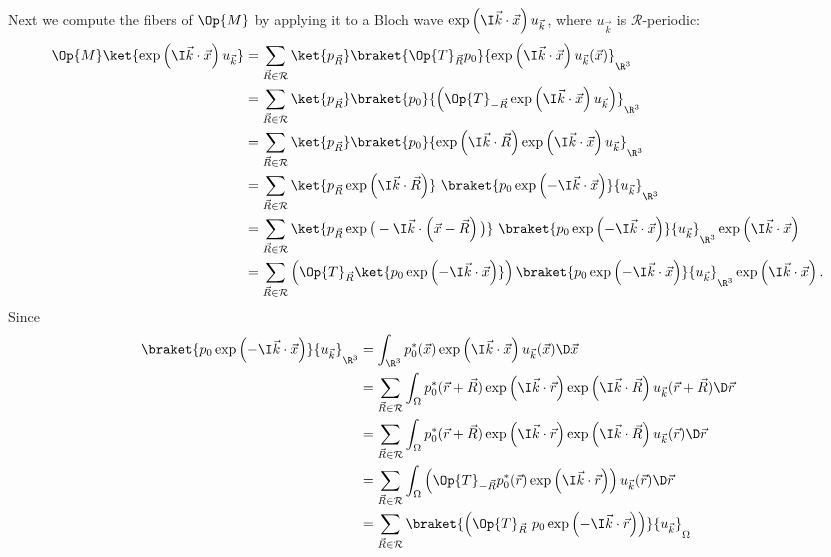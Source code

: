 \documentclass{MFHarticle}
\begin{document}
Next we compute the fibers of $\Op{M}$
by applying it to a
Bloch wave $\exp\left(\I \vec{k} \cdot \vec{x}\right) u_{\vec{k}}$,
where $u_{\vec{k}}$ is $\mathcal{R}$-periodic:
\begin{align*}
\Op{M} \ket{\exp\left(\I \vec{k} \cdot \vec{x}\right) u_{\vec{k}}}
&= \sum_{\vec{R} \in \mathcal{R}}
\ket{p_{\vec{R}}} \braket{\Op{T}_{\vec{R}} p_0}
{\exp\left(\I \vec{k} \cdot \vec{x}\right) u_{\vec{k}}(\vec{x})}_{\R^3} \\
&= \sum_{\vec{R} \in \mathcal{R}}
\ket{p_{\vec{R}}} \braket{p_0}
{\left(\Op{T}_{-\vec{R}}
	\exp\left(\I \vec{k} \cdot \vec{x}\right) u_{\vec{k}}
\right)}_{\R^3} \\
&= \sum_{\vec{R} \in \mathcal{R}}
\ket{p_{\vec{R}}} \braket{p_0}
{
\exp\left(\I \vec{k} \cdot \vec{R}\right)
\exp\left(\I \vec{k} \cdot \vec{x}\right) u_{\vec{k}}
}_{\R^3} \\
&= 
\sum_{\vec{R} \in \mathcal{R}}
\ket{p_{\vec{R}} \exp\left(\I \vec{k} \cdot \vec{R}\right)}
\ 
\braket{p_0 \exp\left(-\I \vec{k} \cdot \vec{x}\right)}
{u_{\vec{k}}}_{\R^3} \\
&= 
\sum_{\vec{R} \in \mathcal{R}}
\ket{p_{\vec{R}} \exp\big(-\I \vec{k} \cdot \left(\vec{x}-\vec{R}\right)\big)}
\ 
\braket{p_0 \exp\left(-\I \vec{k} \cdot \vec{x}\right)}
{u_{\vec{k}}}_{\R^3} \exp\left(\I \vec{k} \cdot \vec{x}\right)\\
&= 
\sum_{\vec{R} \in \mathcal{R}} \left(\Op{T}_{\vec{R}}
\ket{p_0 \exp\left(-\I \vec{k} \cdot \vec{x}\right)}\right)
\braket{p_0 \exp\left(-\I \vec{k} \cdot \vec{x}\right)}
{u_{\vec{k}}}_{\R^3} \exp\left(\I \vec{k} \cdot \vec{x}\right).
\end{align*}
Since
\begin{align*}
	\braket{p_0 \exp\left(-\I \vec{k} \cdot \vec{x}\right)}
	{u_{\vec{k}}}_{\R^3}
	&= \int_{\R^3} p_0^\ast(\vec{x}) \exp\left(\I \vec{k} \cdot \vec{x}\right)
		u_{\vec{k}}(\vec{x}) \D \vec{x} \\
	&= \sum_{\vec{R} \in \mathcal{R}} \int_\Omega
		p_0^\ast(\vec{r} + \vec{R})
		\exp\left(\I \vec{k} \cdot \vec{r}\right)
		\exp\left(\I \vec{k} \cdot \vec{R}\right)
		u_{\vec{k}}(\vec{r} + \vec{R}) \D \vec{r} \\
	&= \sum_{\vec{R} \in \mathcal{R}} \int_\Omega
		p_0^\ast(\vec{r} + \vec{R})
		\exp\left(\I \vec{k} \cdot \vec{r}\right)
		\exp\left(\I \vec{k} \cdot \vec{R}\right)
		u_{\vec{k}}(\vec{r}) \D \vec{r} \\
	&= \sum_{\vec{R} \in \mathcal{R}} \int_\Omega
		\left(
		\Op{T}_{-\vec{R}}
		p_0^\ast(\vec{r})
		\exp\left(\I \vec{k} \cdot \vec{r}\right)
		\right)
		u_{\vec{k}}(\vec{r}) \D \vec{r} \\
	&= \sum_{\vec{R} \in \mathcal{R}}
		\braket{\left(\Op{T}_{\vec{R}} \ 
		p_0 \exp\left(-\I \vec{k} \cdot \vec{r}\right)\right)}
		{u_{\vec{k}}}_\Omega
\end{align*}
\end{document}
